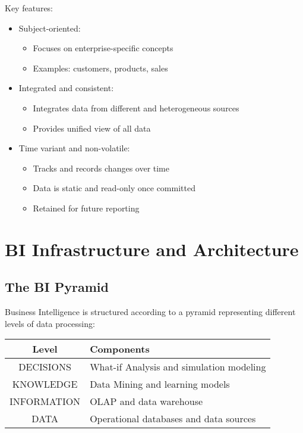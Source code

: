 Key features:
\begin{itemize}
    \item Subject-oriented: 
        \begin{itemize}
            \item Focuses on enterprise-specific concepts
            \item Examples: customers, products, sales
        \end{itemize}
    \item Integrated and consistent:
        \begin{itemize}
            \item Integrates data from different and heterogeneous sources
            \item Provides unified view of all data
        \end{itemize}
    \item Time variant and non-volatile:
        \begin{itemize}
            \item Tracks and records changes over time
            \item Data is static and read-only once committed
            \item Retained for future reporting
        \end{itemize}
\end{itemize}

\section{BI Infrastructure and Architecture}

\subsection{The BI Pyramid}
Business Intelligence is structured according to a pyramid representing different levels of data processing:

\begin{center}
\begin{tabular}{|c|l|}
    \hline
    \textbf{Level} & \textbf{Components} \\
    \hline
    DECISIONS & What-if Analysis and simulation modeling \\
    \hline
    KNOWLEDGE & Data Mining and learning models \\
    \hline
    INFORMATION & OLAP and data warehouse \\
    \hline
    DATA & Operational databases and data sources \\
    \hline
\end{tabular}
\end{center}

